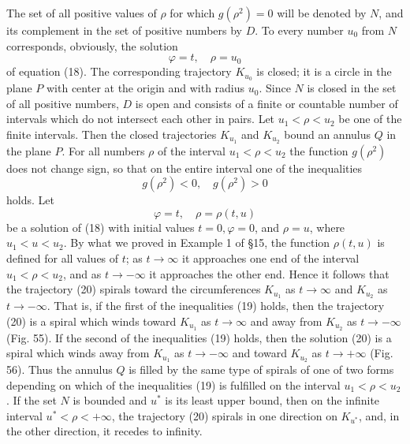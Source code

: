 \documentclass[10pt,a5paper]{book}
\theoremstyle{plain}
\theoremstyle{definition}
\theoremstyle{remark}
\begin{document}
The set of all positive values of $\rho$ for which $g\left(\rho^{2}\right)=0$ will be denoted by $N$, and its complement in the set of positive numbers by $D$. To every number $u_{0}$ from $N$ corresponds, obviously, the solution
\[
\varphi=t, \quad \rho=u_{0}
\]
of equation (18). The corresponding trajectory $K_{u_{0}}$ is closed; it is a circle in the plane $P$ with center at the origin and with radius $u_{0}$. Since $N$ is closed in the set of all positive numbers, $D$ is open and consists of a finite or countable number of intervals which do not intersect each other in pairs. Let $u_{1}<\rho<u_{2}$ be one of the finite intervals. Then the closed trajectories $K_{u_{1}}$ and $K_{u_{2}}$ bound an annulus $Q$ in the plane $P$. For all numbers $\rho$ of the interval $u_{1}<\rho<u_{2}$ the function $g\left(\rho^{2}\right)$ does not change sign, so that on the entire interval one of the inequalities
\begin{equation*}
g\left(\rho^{2}\right)<0, \quad g\left(\rho^{2}\right)>0 \tag{19}
\end{equation*}
holds. Let
\begin{equation*}
\varphi=t, \quad \rho=\rho(t, u) \tag{20}
\end{equation*}
be a solution of (18) with initial values $t=0, \varphi=0$, and $\rho=u$, where $u_{1}<u<u_{2}$. By what we proved in Example 1 of §15, the function $\rho(t, u)$ is defined for all values of $t$; as $t \rightarrow \infty$ it approaches one end of the interval $u_{1}<\rho<u_{2}$, and as $t \rightarrow-\infty$ it approaches the other end. Hence it follows that the trajectory (20) spirals toward the circumferences $K_{u_{1}}$ as $t \rightarrow \infty$ and $K_{u_{2}}$ as $t \rightarrow-\infty$. That is, if the first of the inequalities (19) holds, then the trajectory (20) is a spiral which winds toward $K_{u_{1}}$ as $t \rightarrow \infty$ and away from $K_{u_{2}}$ as $t \rightarrow-\infty$ (Fig. 55). If the second of the inequalities (19) holds, then the solution (20) is a spiral which winds away from $K_{u_{1}}$ as $t \rightarrow-\infty$ and toward $K_{u_{2}}$ as $t \rightarrow+\infty$ (Fig. 56). Thus the annulus $Q$ is filled by the same type of spirals of one of two forms depending on which of the inequalities (19) is fulfilled on the interval $u_{1}<\rho<u_{2}$. If the set $N$ is bounded and $u^{*}$ is its least upper bound, then on the infinite interval $u^{*}<\rho<+\infty$, the trajectory (20) spirals in one direction on $K_{u^{*}}$, and, in the other direction, it recedes to infinity.
\end{document}
